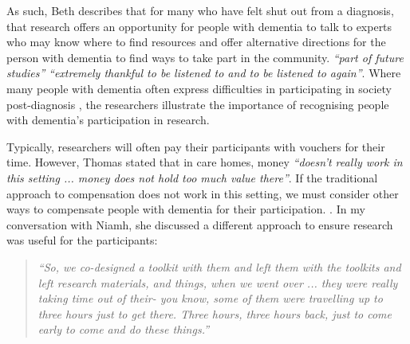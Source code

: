 As such, Beth describes that for many who have felt shut out from a diagnosis, that research offers an opportunity for people with dementia to talk to experts who may know where to find resources and offer alternative directions for the person with dementia to find ways to take part in the community. \textit{``part of future studies''} \textit{``extremely thankful to be listened to and to be listened to again''}. Where many people with dementia often express difficulties in participating in society post-diagnosis \citep{bartlett_citizenship_2014}, the researchers illustrate the importance of recognising people with dementia's participation in research.

Typically, researchers will often pay their participants with vouchers for their time. However, Thomas stated that in care homes, money \textit{``doesn’t really work in this setting ... money does not hold too much value there''}. If the traditional approach to compensation does not work in this setting, we must consider other ways to compensate people with dementia for their participation. . In my conversation with Niamh, she discussed a different approach to ensure research was useful for the participants:
\begin{quote}
    \textit{``So, we co-designed a toolkit with them and left them with the toolkits and left research materials, and things, when we went over ... they were really taking time out of their- you know, some of them were travelling up to three hours just to get there. Three hours, three hours back, just to come early to come and do these things.''}
\end{quote}

